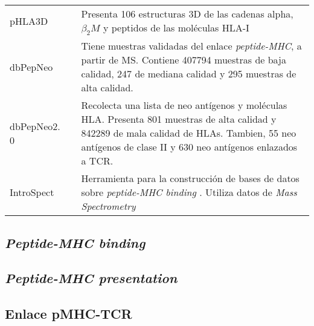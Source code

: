 \begin{table}[H]
\begin{tabular}{lp{3cm}p{8cm}}
		pHLA3D          & \cite{e2019phla3d}                                              & Presenta 106 estructuras 3D de las cadenas alpha, $\beta_2M$ y peptidos de las moléculas HLA-I                                                                                                               \\
		dbPepNeo        & \cite{tan2020dbpepneo}                                          & Tiene muestras validadas del enlace \textit{peptide-MHC}, a partir de MS. Contiene 407794 muestras de baja calidad, 247 de mediana calidad y 295 muestras de alta calidad.                                         \\
		dbPepNeo2. 0    & \cite{lu2022dbpepneo2}                                          & Recolecta una lista de neo antígenos y moléculas HLA. Presenta 801 muestras de alta calidad y 842289  de mala calidad de HLAs. Tambien, 55 neo antígenos de clase II y 630 neo antígenos enlazados a TCR. \\
		IntroSpect      & \cite{zhang2022introspect}                                      & Herramienta para la construcción de bases de datos sobre \textit{peptide-MHC binding} . Utiliza datos de \textit{Mass Spectrometry}                                                                                         
	\end{tabular}
\end{table}


\subsection{\textit{Peptide-MHC binding}}

\subsection{\textit{Peptide-MHC presentation}}

\subsection{Enlace pMHC-TCR}


